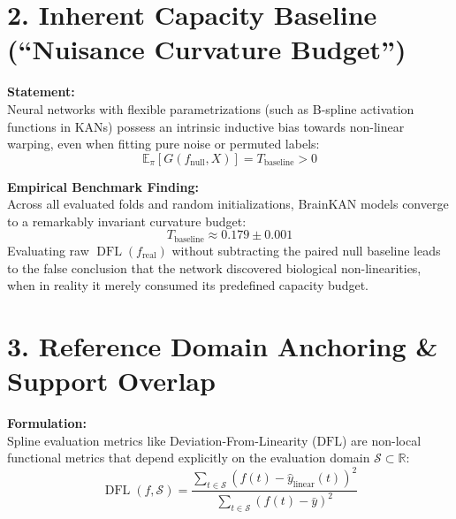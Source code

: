 \documentclass{article}
\begin{document}
\section*{2. Inherent Capacity Baseline (``Nuisance Curvature Budget'')}

\textbf{Statement:}\\
Neural networks with flexible parametrizations (such as B-spline activation functions in KANs) possess an intrinsic inductive bias towards non-linear warping, even when fitting pure noise or permuted labels:
\begin{equation}
\mathbb{E}_{\pi}[G(f_{\mathrm{null}}, X)] = T_{\mathrm{baseline}} > 0
\end{equation}

\textbf{Empirical Benchmark Finding:}\\
Across all evaluated folds and random initializations, BrainKAN models converge to a remarkably invariant curvature budget:
\begin{equation}
T_{\mathrm{baseline}} \approx 0.179 \pm 0.001
\end{equation}
Evaluating raw $\operatorname{DFL}(f_{\mathrm{real}})$ without subtracting the paired null baseline leads to the false conclusion that the network discovered biological non-linearities, when in reality it merely consumed its predefined capacity budget.

\section*{3. Reference Domain Anchoring \& Support Overlap}

\textbf{Formulation:}\\
Spline evaluation metrics like Deviation-From-Linearity ($\mathrm{DFL}$) are non-local functional metrics that depend explicitly on the evaluation domain $\mathcal{S} \subset \mathbb{R}$:
\begin{equation}
\operatorname{DFL}(f, \mathcal{S}) = \frac{\sum_{t \in \mathcal{S}} (f(t) - \hat{y}_{\mathrm{linear}}(t))^2}{\sum_{t \in \mathcal{S}} (f(t) - \bar{y})^2}
\end{equation}
\end{document}
